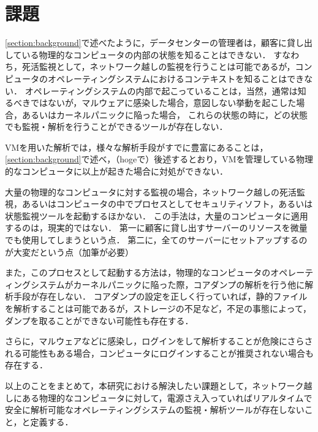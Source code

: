 \section{課題}
\label{section:problem}

\ref{section:background}で述べたように，データセンターの管理者は，顧客に貸し出している物理的なコンピュータの内部の状態を知ることはできない．
すなわち，死活監視として，ネットワーク越しの監視を行うことは可能であるが，コンピュータのオペレーティングシステムにおけるコンテキストを知ることはできない．
オペレーティングシステムの内部で起こっていることは，当然，通常は知るべきではないが，マルウェアに感染した場合，意図しない挙動を起こした場合，あるいはカーネルパニックに陥った場合，
これらの状態の時に，どの状態でも監視・解析を行うことができるツールが存在しない．

VMを用いた解析では，様々な解析手段がすでに豊富にあることは，\ref{section:background}で述べ，（hogeで）後述するとおり，VMを管理している物理的なコンピュータに以上が起きた場合に対処ができない．

大量の物理的なコンピュータに対する監視の場合，ネットワーク越しの死活監視，あるいはコンピュータの中でプロセスとしてセキュリティソフト，あるいは状態監視ツールを起動するほかない．
この手法は，大量のコンピュータに適用するのは，現実的ではない．
第一に顧客に貸し出すサーバーのリソースを微量でも使用してしまうという点．
第二に，全てのサーバーにセットアップするのが大変だという点（加筆が必要）

また，このプロセスとして起動する方法は，物理的なコンピュータのオペレーティングシステムがカーネルパニックに陥った際，コアダンプの解析を行う他に解析手段が存在しない．
コアダンプの設定を正しく行っていれば，静的ファイルを解析することは可能であるが，ストレージの不足など，不足の事態によって，ダンプを取ることができない可能性も存在する．

さらに，マルウェアなどに感染し，ログインをして解析することが危険にさらされる可能性もある場合，コンピュータにログインすることが推奨されない場合も存在する．

以上のことをまとめて，本研究における解決したい課題として，ネットワーク越しにある物理的なコンピュータに対して，電源さえ入っていればリアルタイムで安全に解析可能なオペレーティングシステムの監視・解析ツールが存在しないこと，と定義する．



